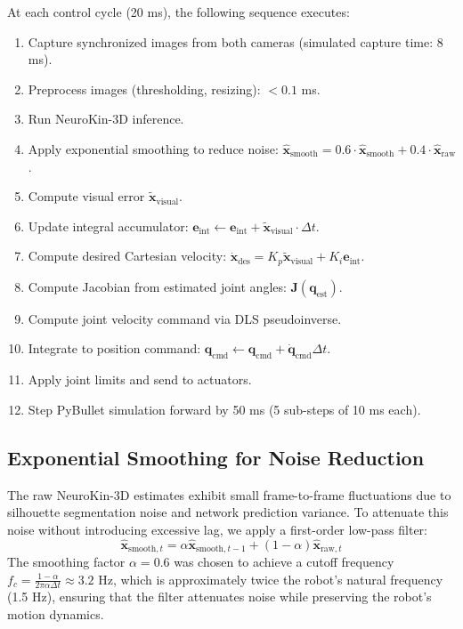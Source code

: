 \documentclass[12pt,a4paper,oneside]{report}
\begin{document}
At each control cycle (20 ms), the following sequence executes:
\begin{enumerate}
    \item Capture synchronized images from both cameras (simulated capture time: 8 ms).
    \item Preprocess images (thresholding, resizing): $<0.1$ ms.
    \item Run NeuroKin-3D inference.
    \item Apply exponential smoothing to reduce noise: $\hat{\mathbf{x}}_{\text{smooth}} = 0.6 \cdot \hat{\mathbf{x}}_{\text{smooth}} + 0.4 \cdot \hat{\mathbf{x}}_{\text{raw}}$.
    \item Compute visual error $\tilde{\mathbf{x}}_{\text{visual}}$.
    \item Update integral accumulator: $\mathbf{e}_{\text{int}} \leftarrow \mathbf{e}_{\text{int}} + \tilde{\mathbf{x}}_{\text{visual}} \cdot \Delta t$.
    \item Compute desired Cartesian velocity: $\dot{\mathbf{x}}_{\text{des}} = K_p \tilde{\mathbf{x}}_{\text{visual}} + K_i \mathbf{e}_{\text{int}}$.
    \item Compute Jacobian from estimated joint angles: $\mathbf{J}(\mathbf{q}_{\text{est}})$.
    \item Compute joint velocity command via DLS pseudoinverse.
    \item Integrate to position command: $\mathbf{q}_{\text{cmd}} \leftarrow \mathbf{q}_{\text{cmd}} + \dot{\mathbf{q}}_{\text{cmd}} \Delta t$.
    \item Apply joint limits and send to actuators.
    \item Step PyBullet simulation forward by 50 ms (5 sub-steps of 10 ms each).
\end{enumerate}

\subsection{Exponential Smoothing for Noise Reduction}

The raw NeuroKin-3D estimates exhibit small frame-to-frame fluctuations due to silhouette segmentation noise and network prediction variance. To attenuate this noise without introducing excessive lag, we apply a first-order low-pass filter:
\begin{equation}
\hat{\mathbf{x}}_{\text{smooth},t} = \alpha \hat{\mathbf{x}}_{\text{smooth},t-1} + (1 - \alpha) \hat{\mathbf{x}}_{\text{raw},t}
\end{equation}
The smoothing factor $\alpha = 0.6$ was chosen to achieve a cutoff frequency $f_c = \frac{1-\alpha}{2\pi \alpha \Delta t} \approx 3.2$ Hz, which is approximately twice the robot's natural frequency (1.5 Hz), ensuring that the filter attenuates noise while preserving the robot's motion dynamics.
\end{document}
